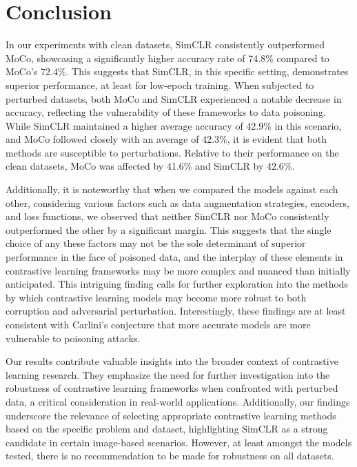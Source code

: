 \section{Conclusion}\vspace{-2mm}

\iffalse 
\begin{enumerate}
    \item Summarize the key findings and their implications.
    \item Reflect on how your results contribute to the broader context.
    \item Address any limitations and suggest avenues for future research.
\end{enumerate}
\fi 
In our experiments with clean datasets, SimCLR consistently outperformed MoCo, showcasing a significantly higher accuracy rate of 74.8\% compared to MoCo's 72.4\%. This suggests that SimCLR, in this specific setting, demonstrates superior performance, at least for low-epoch training. When subjected to perturbed datasets, both MoCo and SimCLR experienced a notable decrease in accuracy, reflecting the vulnerability of these frameworks to data poisoning. While SimCLR maintained a higher average accuracy of 42.9\% in this scenario, and MoCo followed closely with an average of 42.3\%, it is evident that both methods are susceptible to perturbations. Relative to their performance on the clean datasets, MoCo was affected by 41.6\% and SimCLR by 42.6\%.

Additionally, it is noteworthy that when we compared the models against each other, considering various factors such as data augmentation strategies, encoders, and loss functions, we observed that neither SimCLR nor MoCo consistently outperformed the other by a significant margin. This suggests that the single choice of any these factors may not be the sole determinant of superior performance in the face of poisoned data, and the interplay of these elements in contrastive learning frameworks may be more complex and nuanced than initially anticipated. This intriguing finding calls for further exploration into the methods by which contrastive learning models may become more robust to both corruption and adversarial perturbation. Interestingly, these findings are at least consistent with Carlini's conjecture that more accurate models are more vulnerable to poisoning attacks.

Our results contribute valuable insights into the broader context of contrastive learning research. They emphasize the need for further investigation into the robustness of contrastive learning frameworks when confronted with perturbed data, a critical consideration in real-world applications. Additionally, our findings underscore the relevance of selecting appropriate contrastive learning methods based on the specific problem and dataset, highlighting SimCLR as a strong candidate in certain image-based scenarios. However, at least amongst the models tested, there is no recommendation to be made for robustness on all datasets.

